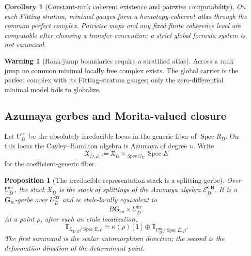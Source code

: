 \documentclass[11pt]{article}
\newtheorem{proposition}[theorem]{Proposition}
\newtheorem{corollary}[theorem]{Corollary}
\theoremstyle{definition}
\newtheorem{warning}[theorem]{Warning}
\newcommand{\Gm}{\mathbf G_m}
\begin{document}
\begin{corollary}[Constant-rank coherent existence and pairwise computability]\label{cor:constant-rank-gluing-solved}
On each Fitting stratum, minimal gauges form a homotopy-coherent atlas through the common perfect complex.  Pairwise maps and any fixed finite coherence level are computable after choosing a transfer convention; a strict global formula system is not canonical.
\end{corollary}

\begin{warning}[Rank-jump boundaries require a stratified atlas]\label{warn:stratified-not-global-minimal}
Across a rank jump no common minimal locally free complex exists.  The global carrier is the perfect complex with its Fitting-stratum gauges; only the zero-differential minimal model fails to globalize.
\end{warning}

\subsection{Azumaya gerbes and Morita-valued closure}

Let $U_{\bar D}^{\mathrm{irr}}$ be the absolutely irreducible locus in the generic fiber of $\operatorname{Spec}R_{\bar D}$.  On this locus the Cayley--Hamilton algebra is Azumaya of degree $n$.  Write
\[
\mathfrak X_{\bar D,E}:=\mathfrak X_{\bar D}\times_{\operatorname{Spec}\mathcal O_E}\operatorname{Spec}E
\]
for the coefficient-generic fiber.

\begin{proposition}[The irreducible representation stack is a splitting gerbe]\label{prop:azumaya-gerbe}
Over $U_{\bar D}^{\mathrm{irr}}$, the stack $\mathfrak X_{\bar D}$ is the stack of splittings of the Azumaya algebra $\mathcal E^{\mathrm{CH}}_{\bar D}$.  It is a $\Gm$-gerbe over $U_{\bar D}^{\mathrm{irr}}$ and is etale-locally equivalent to
\[
B\Gm\times U_{\bar D}^{\mathrm{irr}}.
\]
At a point $\rho$, after such an etale localization,
\begin{equation}\label{eq:azumaya-tangent-splitting}
\mathbb T_{\mathfrak X_{\bar D,E}/\operatorname{Spec}E,\rho}
\simeq
\kappa(\rho)[1]
\oplus
\mathbb T_{U_{\bar D}^{\mathrm{irr}}/\operatorname{Spec}E,\rho}.
\end{equation}
The first summand is the scalar automorphism direction; the second is the deformation direction of the determinant point.
\end{proposition}
\end{document}
